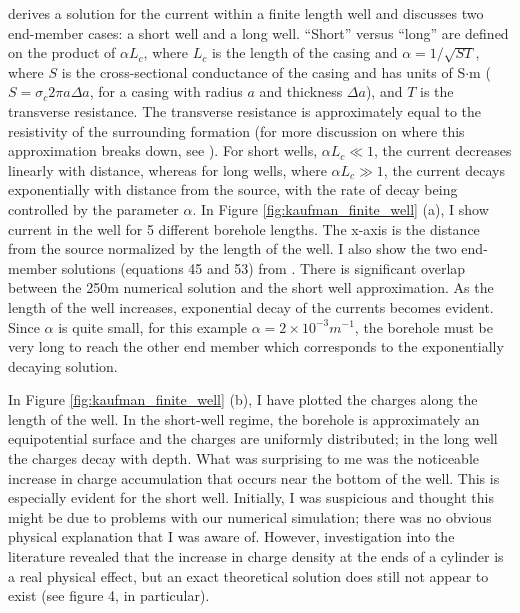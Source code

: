 \cite{Kaufman1993} derives a solution for the current within a finite length well and discusses two end-member cases: a short well and a long well. ``Short'' versus ``long'' are defined on the product of $\alpha L_c$, where $L_c$ is the length of the casing and $\alpha = 1/\sqrt{S T}$, where $S$ is the cross-sectional conductance of the casing and has units of S$\cdot$m ($S = \sigma_c 2\pi a \Delta a$, for a casing with radius $a$ and thickness $\Delta a$), and $T$ is the transverse resistance. The transverse resistance is approximately equal to the resistivity of the surrounding formation (for more discussion on where this approximation breaks down, see \cite{Schenkel1994}). For short wells, $\alpha L_c \ll 1$, the current decreases linearly with distance, whereas for long wells, where $\alpha L_c \gg 1$, the current decays exponentially with distance from the source, with the rate of decay being controlled by the parameter $\alpha$. In Figure \ref{fig:kaufman_finite_well} (a), I show current in the well for 5 different borehole lengths. The x-axis is the distance from the source normalized by the length of the well. I also show the two end-member solutions (equations 45 and 53) from \cite{Kaufman1993}. There is significant overlap between the 250m numerical solution and the short well approximation. As the length of the well increases, exponential decay of the currents becomes evident. Since $\alpha$ is quite small, for this example $\alpha = 2 \times 10^{-3} m^{-1}$, the borehole must be very long to reach the other end member which corresponds to the exponentially decaying solution.




In Figure \ref{fig:kaufman_finite_well} (b), I have plotted the charges along the length of the well. In the short-well regime, the borehole is approximately an equipotential surface and the charges are uniformly distributed; in the long well the charges decay with depth. What was surprising to me was the noticeable increase in charge accumulation that occurs near the bottom of the well. This is especially evident for the short well. Initially, I was suspicious and thought this might be due to problems with our numerical simulation; there was no obvious physical explanation that I was aware of. However, investigation into the literature revealed that the increase in charge density at the ends of a cylinder is a real physical effect, but an exact theoretical solution does still not appear to exist \citep{Griffiths1997} (see figure 4, in particular).

